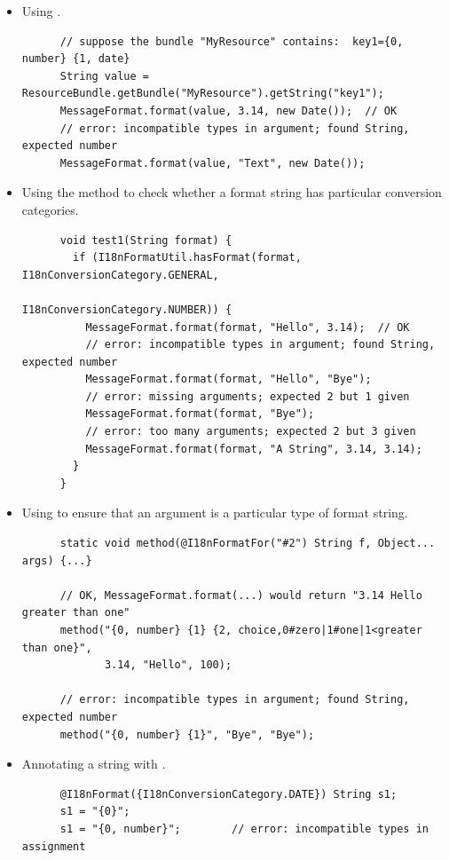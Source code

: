\begin{itemize}
  \item Using .
\begin{Verbatim}
      // suppose the bundle "MyResource" contains:  key1={0, number} {1, date}
      String value = ResourceBundle.getBundle("MyResource").getString("key1");
      MessageFormat.format(value, 3.14, new Date());  // OK
      // error: incompatible types in argument; found String, expected number
      MessageFormat.format(value, "Text", new Date());
\end{Verbatim}
  \item Using the
    method to check whether a format
    string has particular conversion categories.
\begin{Verbatim}
      void test1(String format) {
        if (I18nFormatUtil.hasFormat(format, I18nConversionCategory.GENERAL,
                                             I18nConversionCategory.NUMBER)) {
          MessageFormat.format(format, "Hello", 3.14);  // OK
          // error: incompatible types in argument; found String, expected number
          MessageFormat.format(format, "Hello", "Bye");
          // error: missing arguments; expected 2 but 1 given
          MessageFormat.format(format, "Bye");
          // error: too many arguments; expected 2 but 3 given
          MessageFormat.format(format, "A String", 3.14, 3.14);
        }
      }
\end{Verbatim}
  \item Using 
    to ensure that an argument is a particular type of format string.
\begin{Verbatim}
      static void method(@I18nFormatFor("#2") String f, Object... args) {...}

      // OK, MessageFormat.format(...) would return "3.14 Hello greater than one"
      method("{0, number} {1} {2, choice,0#zero|1#one|1<greater than one}",
             3.14, "Hello", 100);

      // error: incompatible types in argument; found String, expected number
      method("{0, number} {1}", "Bye", "Bye");
\end{Verbatim}
  \item Annotating a string with
    .
\begin{Verbatim}
      @I18nFormat({I18nConversionCategory.DATE}) String s1;
      s1 = "{0}";
      s1 = "{0, number}";        // error: incompatible types in assignment
\end{Verbatim}
\end{itemize}

